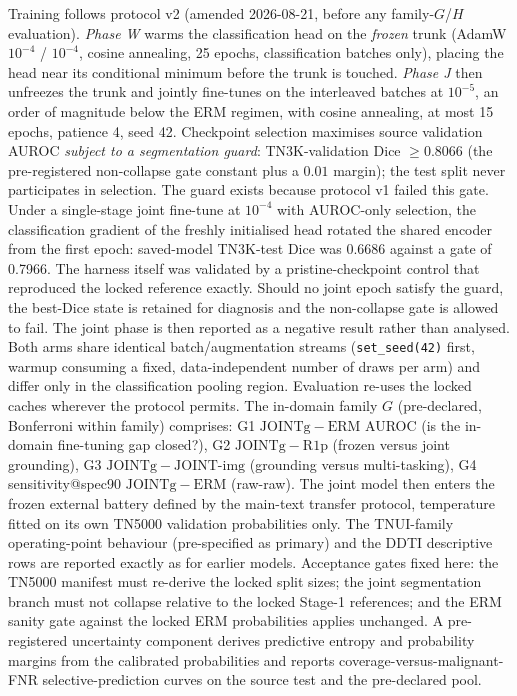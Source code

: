 \documentclass[11pt]{article}
\begin{document}
Training follows protocol v2 (amended 2026-08-21, before any family-$G$/$H$
evaluation). \emph{Phase W} warms the classification head on the
\emph{frozen} trunk (AdamW $10^{-4}$ / $10^{-4}$, cosine annealing, 25
epochs, classification batches only), placing the head near its conditional
minimum before the trunk is touched. \emph{Phase J} then unfreezes the trunk
and jointly fine-tunes on the interleaved batches at $10^{-5}$, an order of
magnitude below the ERM regimen, with cosine annealing, at most 15 epochs,
patience 4, seed 42. Checkpoint selection maximises source validation AUROC
\emph{subject to a segmentation guard}: TN3K-validation Dice
$\geq 0.8066$ (the pre-registered non-collapse gate constant plus a $0.01$
margin); the test split never participates in selection. The guard exists
because protocol v1 failed this gate. Under a single-stage joint fine-tune
at $10^{-4}$ with AUROC-only
selection, the classification gradient of the freshly initialised head rotated the
shared encoder from the first epoch: saved-model TN3K-test Dice was 0.6686
against a gate of 0.7966. The harness itself was validated by a
pristine-checkpoint
control that reproduced the locked reference exactly. Should no joint epoch
satisfy the guard, the best-Dice state is retained for diagnosis and the
non-collapse gate is allowed to fail. The joint phase is then reported as a
negative result rather than analysed. Both arms share identical
batch/augmentation streams (\texttt{set\_seed(42)} first, warmup consuming a
fixed, data-independent number of draws per arm) and differ only in the
classification pooling region. Evaluation
re-uses the locked caches wherever the protocol permits. The in-domain
family $G$ (pre-declared, Bonferroni within family) comprises: G1
$\mathrm{JOINTg}-\mathrm{ERM}$ AUROC (is the in-domain fine-tuning gap
closed?), G2 $\mathrm{JOINTg}-\mathrm{R1p}$ (frozen versus joint
grounding), G3 $\mathrm{JOINTg}-\mathrm{JOINT\textrm{-}img}$ (grounding
versus multi-tasking), G4 sensitivity@spec90 $\mathrm{JOINTg}-\mathrm{ERM}$
(raw-raw). The joint model then enters the frozen external battery defined by the main-text transfer protocol,
temperature fitted on its own TN5000 validation probabilities only.
The TNUI-family operating-point behaviour (pre-specified as primary) and
the DDTI descriptive rows are reported exactly as for earlier models.
Acceptance gates fixed here: the TN5000 manifest must re-derive the locked
split sizes; the joint segmentation branch must not collapse relative to
the locked Stage-1 references; and the ERM sanity gate against the locked
ERM probabilities applies unchanged. A pre-registered uncertainty
component derives predictive entropy and probability margins from the
calibrated probabilities and reports coverage-versus-malignant-FNR
selective-prediction curves on the source test and the pre-declared pool.
\end{document}
